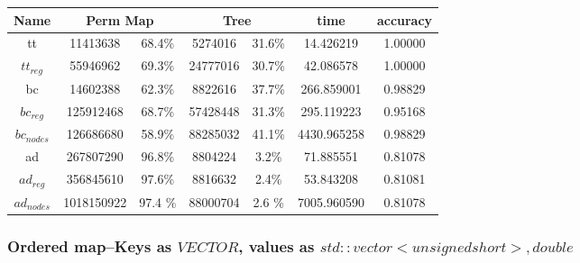 \documentclass[]{article}
\begin{document}
\begin{center}
\begin{tabular} { |c|c|c|c|c|c|c| }
\hline
Name & \multicolumn{2}{c|}{Perm Map} & \multicolumn{2}{c|}{Tree} & time & accuracy \\
\hline

tt & 11413638 & 68.4\%  & 5274016 & 31.6\% & 14.426219 & 1.00000 \\

$tt_{reg}$ & 55946962 & 69.3\% & 24777016 & 30.7\% & 42.086578 & 1.00000 \\

bc & 14602388 & 62.3\% & 8822616 & 37.7\% & 266.859001 & 0.98829 \\

$bc_{reg}$ & 125912468 & 68.7\% & 57428448 & 31.3\% & 295.119223 & 0.95168 \\

$bc_{nodes}$ & 126686680 & 58.9\% & 88285032 & 41.1\% & 4430.965258 & 0.98829 \\

ad & 267807290 & 96.8\% & 8804224 & 3.2\% & 71.885551 & 0.81078 \\

$ad_{reg}$ & 356845610 & 97.6\% & 8816632 & 2.4\% & 53.843208 & 0.81081 \\

$ad_{nodes}$ & 1018150922 & 97.4 \% & 88000704 & 2.6 \% & 7005.960590 &  0.81078\\
\hline
\end{tabular}
\end{center}

\subsubsection{Ordered map--Keys as $VECTOR$, values as $std::vector<unsigned short>, double$}
\end{document}
